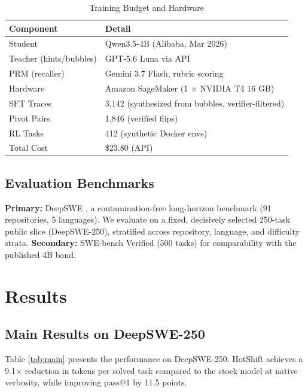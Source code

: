 \documentclass[conference]{IEEEtran}
\begin{document}
\begin{table}[htbp]
\caption{Training Budget and Hardware}
\centering
\begin{tabular}{@{}ll@{}}
\toprule
\textbf{Component} & \textbf{Detail} \\
\midrule
Student & Qwen3.5-4B (Alibaba, Mar 2026) \\
Teacher (hints/bubbles) & GPT-5.6 Luna via API \\
PRM (recaller) & Gemini 3.7 Flash, rubric scoring \\
Hardware & Amazon SageMaker (1 $\times$ NVIDIA T4 16 GB) \\
SFT Traces & 3,142 (synthesized from bubbles, verifier-filtered) \\
Pivot Pairs & 1,846 (verified flips) \\
RL Tasks & 412 (synthetic Docker envs) \\
Total Cost & \$23.80 (API) \\
\bottomrule
\end{tabular}
\label{tab:budget}
\end{table}

\subsection{Evaluation Benchmarks}
\textbf{Primary:} DeepSWE \cite{deepswe}, a contamination-free long-horizon benchmark (91 repositories, 5 languages). We evaluate on a fixed, decisively selected 250-task public slice (DeepSWE-250), stratified across repository, language, and difficulty strata.
\textbf{Secondary:} SWE-bench Verified (500 tasks) \cite{swebench} for comparability with the published 4B band.

\section{Results}
\label{sec:results}

\subsection{Main Results on DeepSWE-250}
Table \ref{tab:main} presents the performance on DeepSWE-250. HotShift achieves a 9.1$\times$ reduction in tokens per solved task compared to the stock model at native verbosity, while improving pass@1 by 11.5 points.
\end{document}
